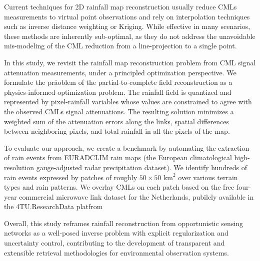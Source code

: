 \documentclass{article}
\begin{document}
Current techniques for 2D rainfall map reconstruction usually reduce  CMLs measurements to virtual point observations and rely on interpolation techniques such as inverse distance weighting or Kriging. While effective in many scenarios, these methods are inherently sub-optimal, as they do not address the unavoidable mis-modeling of the CML reduction from a line-projection to a single point.

In this study, we revisit the rainfall map reconstruction problem from CML signal attenuation measurements, under a principled optimization perspective. We formulate the pråoblem of the partial-to-complete field reconstruction as a physics-informed optimization problem. The rainfall field is quantized and represented by pixel-rainfall variables whose values are constrained to agree with the observed CMLs signal attenuations. The resulting solution minimizes a weighted sum of the attenuation errors along the links, spatial differences between neighboring pixels, and total rainfall in all the pixels of the map. 

To evaluate our approach, we create a benchmark by automating the extraction
of rain events from EURADCLIM rain maps (the European climatological high-resolution gauge-adjusted radar precipitation dataset). We identify hundreds of rain events expressed by patches of roughly $50\times 50$ $\text{km}^2$ over various terrain types and rain patterns.
%
We overlay CMLs on each patch based on the free four-year commercial microwave link dataset for the Netherlands, pubilcly available in the 4TU.ResearchData platfrom 





Overall, this study reframes rainfall reconstruction from opportunistic sensing networks as a well-posed inverse problem with explicit regularization and uncertainty control, contributing to the development of transparent and extensible retrieval methodologies for environmental observation systems.
\end{document}
